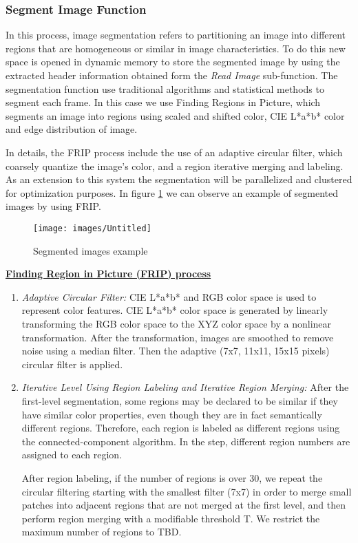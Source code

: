 \documentclass[12pt]{article}
\begin{document}
\subsubsection{Segment Image Function}
\label{sec:segment_image_function}
In this process, image segmentation refers to partitioning an image
into different regions that are homogeneous or similar in image
characteristics. To do this new space is opened in dynamic memory to
store the segmented image by using the extracted header information
obtained form the \textit{Read Image} sub-function. The segmentation
function use traditional algorithms and statistical methods to segment
each frame. In this case we use Finding Regions in Picture, which
segments an image into regions using scaled and shifted color, CIE
L*a*b* color and edge distribution of image.

In details, the FRIP process include the use of an adaptive circular
filter, which coarsely quantize the image's color, and a region
iterative merging and labeling. As an extension to this system the
segmentation will be parallelized and clustered for optimization
purposes. In figure \ref{fig:segmented_images} we can observe an
example of segmented images by using FRIP.
\begin{figure}[!h]\centering
  \texttt{[image: images/Untitled]}
  \caption{Segmented images example}
  \label{fig:segmented_images}
\end{figure}

\textbf{\underline{Finding Region in Picture (FRIP) process}}

\begin{enumerate}
\item \textit{Adaptive Circular Filter:} CIE L*a*b* and RGB color
  space is used to represent color features. CIE L*a*b* color space is
  generated by linearly transforming the RGB color space to the XYZ
  color space by a nonlinear transformation. After the transformation,
  images are smoothed to remove noise using a median filter. Then the
  adaptive (7x7, 11x11, 15x15 pixels) circular filter is applied.
\item \textit{Iterative Level Using Region Labeling and Iterative
    Region Merging:} After the first-level segmentation, some regions
  may be declared to be similar if they have similar color properties,
  even though they are in fact semantically different
  regions. Therefore, each region is labeled as different regions
  using the connected-component algorithm. In the step, different
  region numbers are assigned to each region.

  After region labeling, if the number of regions is over 30, we
  repeat the circular filtering starting with the smallest filter
  (7x7) in order to merge small patches into adjacent regions that are
  not merged at the first level, and then perform region merging with
  a modifiable threshold T. We restrict the maximum number of regions
  to TBD.
\end{enumerate}
\end{document}
